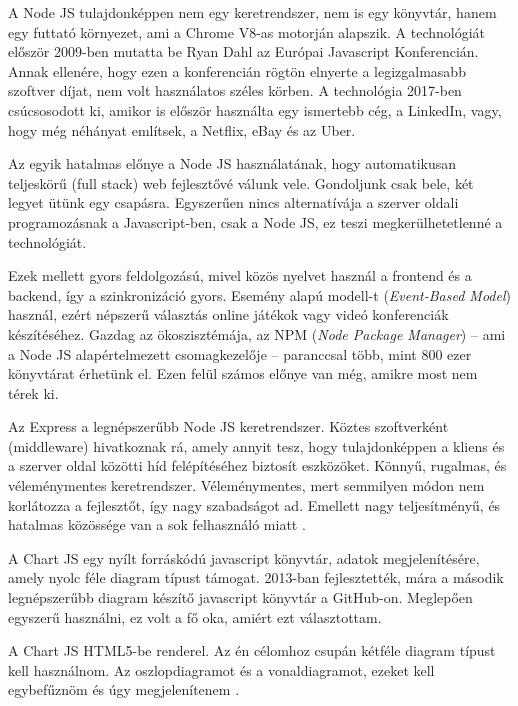 A Node JS tulajdonképpen nem egy keretrendszer, nem is egy könyvtár, hanem egy futtató környezet, ami a Chrome V8-as motorján alapszik. A technológiát először 2009-ben mutatta be Ryan Dahl az Európai Javascript Konferencián. Annak ellenére, hogy ezen a konferencián rögtön elnyerte a legizgalmasabb szoftver díjat, nem volt használatos széles körben. A technológia 2017-ben csúcsosodott ki, amikor is először használta egy ismertebb cég, a LinkedIn, vagy, hogy még néhányat említsek, a Netflix, eBay és az Uber.

Az egyik hatalmas előnye a Node JS használatának, hogy automatikusan teljeskörű (full stack) web fejlesztővé válunk vele. Gondoljunk csak bele, két legyet ütünk egy csapásra. Egyszerűen nincs alternatívája a szerver oldali programozásnak a Javascript-ben, csak a Node JS, ez teszi megkerülhetetlenné a technológiát.

Ezek mellett gyors feldolgozású, mivel közös nyelvet használ a frontend és a backend, így a szinkronizáció gyors. Esemény alapú modell-t (\textit{Event-Based Model}) használ, ezért népszerű választás online játékok vagy videó konferenciák készítéséhez. Gazdag az ökoszisztémája, az NPM (\textit{Node Package Manager}) -- ami a Node JS alapértelmezett csomagkezelője -- paranccsal több, mint 800 ezer könyvtárat érhetünk el. Ezen felül számos előnye van még, amikre most nem térek ki.

Az Express a legnépszerűbb Node JS keretrendszer. Köztes szoftverként (middleware) hivatkoznak rá, amely annyit tesz, hogy tulajdonképpen a kliens és a szerver oldal közötti híd felépítéséhez biztosít eszközöket. Könnyű, rugalmas, és véleménymentes keretrendszer. Véleménymentes, mert semmilyen módon nem korlátozza a fejlesztőt, így nagy szabadságot ad. Emellett nagy teljesítményű, és hatalmas közössége van a sok felhasználó miatt
\cite{node}.


A Chart JS egy nyílt forráskódú javascript könyvtár, adatok megjelenítésére, amely nyolc féle diagram típust támogat. 2013-ban fejlesztették, mára a második legnépszerűbb diagram készítő javascript könyvtár a GitHub-on. Meglepően egyszerű használni, ez volt a fő oka, amiért ezt választottam. 

A Chart JS HTML5-be renderel. Az én célomhoz csupán kétféle diagram típust kell használnom. Az oszlopdiagramot és a vonaldiagramot, ezeket kell egybefűznöm és úgy megjelenítenem
\cite{chartjs}.


